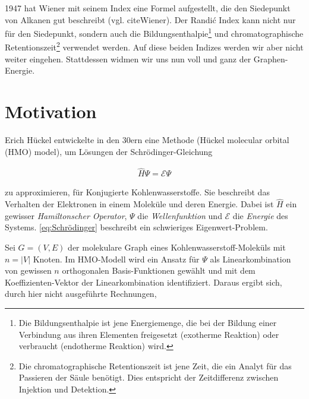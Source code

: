         \begin{remark}

            1947 hat Wiener mit seinem Index eine Formel aufgestellt, die den Siedepunkt von Alkanen gut beschreibt (vgl. cite{Wiener}).
            Der Randić Index kann nicht nur für den Siedepunkt, sondern auch die Bildungsenthalpie\footnote{Die Bildungsenthalpie ist jene Energiemenge, die bei der Bildung einer Verbindung aus ihren Elementen freigesetzt (exotherme Reaktion) oder verbraucht (endotherme Reaktion) wird.} und chromatographische Retentionszeit\footnote{Die chromatographische Retentionszeit ist jene Zeit, die ein Analyt für das Passieren der Säule benötigt. Dies entspricht der Zeitdifferenz zwischen Injektion und Detektion.} verwendet werden.
            Auf diese beiden Indizes werden wir aber nicht weiter eingehen.
            Stattdessen widmen wir uns nun voll und ganz der Graphen-Energie.

        \end{remark}


    \section{Motivation}

        Erich Hückel entwickelte in den 30ern eine Methode (Hückel molecular orbital (HMO) model), um Lösungen der Schrödinger-Gleichung
        
        \begin{align} \label{eq:Schrödinger}
            \hat H \Psi = \mathcal E \Psi
        \end{align}
        
        zu approximieren, für Konjugierte Kohlenwasserstoffe.
        Sie beschreibt das Verhalten der Elektronen in einem Moleküle und deren Energie.
        Dabei ist $\hat H$ ein gewisser \textit{Hamiltonscher Operator}, $\Psi$ die \textit{Wellenfunktion} und $\mathcal E$ die \textit{Energie} des Systems.
        \eqref{eq:Schrödinger} beschreibt ein schwieriges Eigenwert-Problem.

        Sei $G = (V, E)$ der molekulare Graph eines Kohlenwasserstoff-Moleküls mit $n = |V|$ Knoten.
        Im HMO-Modell wird ein Ansatz für $\Psi$ als Linearkombination von gewissen $n$ orthogonalen Basis-Funktionen gewählt und mit dem Koeffizienten-Vektor der Linearkombination identifiziert.
        Daraus ergibt sich, durch hier nicht ausgeführte Rechnungen,


